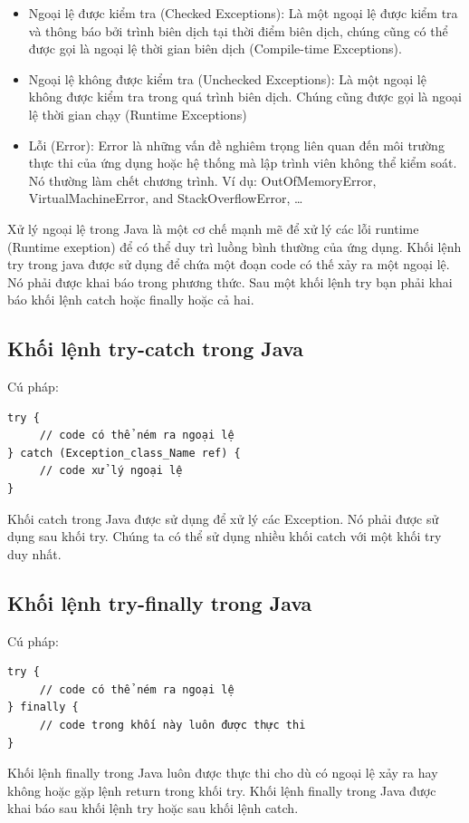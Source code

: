 \begin{itemize}
\item Ngoại lệ được kiểm tra (Checked Exceptions): Là một ngoại lệ được kiểm tra và thông báo bởi trình biên dịch tại thời điểm biên dịch, chúng cũng có thể được gọi là ngoại lệ thời gian biên dịch (Compile-time Exceptions).
\item Ngoại lệ không được kiểm tra (Unchecked Exceptions): Là một ngoại lệ không được kiểm tra trong quá trình biên dịch. Chúng cũng được gọi là ngoại lệ thời gian chạy (Runtime Exceptions)
\item Lỗi (Error): Error là những vấn đề nghiêm trọng liên quan đến môi trường thực thi của ứng dụng hoặc hệ thống mà lập trình viên không thể kiểm soát. Nó thường làm chết chương trình. Ví dụ: OutOfMemoryError, VirtualMachineError, and StackOverflowError, …
\end{itemize}
 
\indent Xử lý ngoại lệ trong Java là một cơ chế mạnh mẽ để xử lý các lỗi runtime (Runtime exeption) để có thể duy trì luồng bình thường của ứng dụng. Khối lệnh try trong java được sử dụng để chứa một đoạn code có thế xảy ra một ngoại lệ. Nó phải được khai báo trong phương thức. Sau một khối lệnh try bạn phải khai báo khối lệnh catch hoặc finally hoặc cả hai.
\subsection{Khối lệnh try-catch trong Java}
\indent Cú pháp:
\begin{verbatim}
try {  
     // code có thể ném ra ngoại lệ
} catch (Exception_class_Name ref) {
     // code xử lý ngoại lệ
} 
\end{verbatim}
 
\indent Khối catch trong Java được sử dụng để xử lý các Exception. Nó phải được sử dụng sau khối try. Chúng ta có thể sử dụng nhiều khối catch với một khối try duy nhất.
\subsection{Khối lệnh try-finally trong Java}
\indent Cú pháp:
\begin{verbatim}
try {  
     // code có thể ném ra ngoại lệ
} finally {
     // code trong khối này luôn được thực thi
}
\end{verbatim}

\indent Khối lệnh finally trong Java luôn được thực thi cho dù có ngoại lệ xảy ra hay không hoặc gặp lệnh return trong khối try. Khối lệnh finally trong Java được khai báo sau khối lệnh try hoặc sau khối lệnh catch. 
